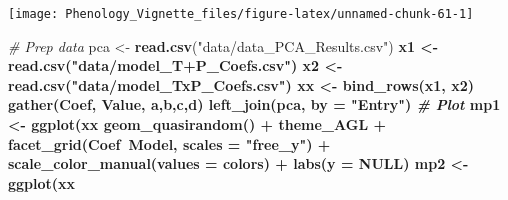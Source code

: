\documentclass[
]{article}
\newenvironment{Shaded}{\begin{snugshade}}{\end{snugshade}}
\newcommand{\CommentTok}[1]{\textcolor[rgb]{0.56,0.35,0.01}{\textit{#1}}}
\newcommand{\DataTypeTok}[1]{\textcolor[rgb]{0.13,0.29,0.53}{#1}}
\newcommand{\KeywordTok}[1]{\textcolor[rgb]{0.13,0.29,0.53}{\textbf{#1}}}
\newcommand{\NormalTok}[1]{#1}
\newcommand{\OperatorTok}[1]{\textcolor[rgb]{0.81,0.36,0.00}{\textbf{#1}}}
\newcommand{\OtherTok}[1]{\textcolor[rgb]{0.56,0.35,0.01}{#1}}
\newcommand{\StringTok}[1]{\textcolor[rgb]{0.31,0.60,0.02}{#1}}
\begin{document}
\texttt{[image: Phenology\_Vignette\_files/figure-latex/unnamed-chunk-61-1]}

\begin{Shaded}
\begin{Highlighting}[]
\CommentTok{# Prep data}
\NormalTok{pca <-}\StringTok{ }\KeywordTok{read.csv}\NormalTok{(}\StringTok{"data/data_PCA_Results.csv"}\NormalTok{) }\OperatorTok{%
\NormalTok{x1 <-}\StringTok{ }\KeywordTok{read.csv}\NormalTok{(}\StringTok{"data/model_T+P_Coefs.csv"}\NormalTok{) }\OperatorTok{%
\NormalTok{x2 <-}\StringTok{ }\KeywordTok{read.csv}\NormalTok{(}\StringTok{"data/model_TxP_Coefs.csv"}\NormalTok{) }\OperatorTok{%
\NormalTok{xx <-}\StringTok{ }\KeywordTok{bind_rows}\NormalTok{(x1, x2) }\OperatorTok{%
\StringTok{  }\KeywordTok{gather}\NormalTok{(Coef, Value, a,b,c,d) }\OperatorTok{%
\StringTok{  }\KeywordTok{left_join}\NormalTok{(pca, }\DataTypeTok{by =} \StringTok{"Entry"}\NormalTok{) }\OperatorTok{%
\CommentTok{# Plot}
\NormalTok{mp1 <-}\StringTok{ }\KeywordTok{ggplot}\NormalTok{(xx}\OperatorTok{%
\StringTok{  }\KeywordTok{geom_quasirandom}\NormalTok{() }\OperatorTok{+}\StringTok{ }\NormalTok{theme_AGL }\OperatorTok{+}
\StringTok{  }\KeywordTok{facet_grid}\NormalTok{(Coef}\OperatorTok{~}\NormalTok{Model, }\DataTypeTok{scales =} \StringTok{"free_y"}\NormalTok{) }\OperatorTok{+}\StringTok{ }
\StringTok{  }\KeywordTok{scale_color_manual}\NormalTok{(}\DataTypeTok{values =}\NormalTok{ colors) }\OperatorTok{+}\StringTok{ }\KeywordTok{labs}\NormalTok{(}\DataTypeTok{y =} \OtherTok{NULL}\NormalTok{)}
\NormalTok{mp2 <-}\StringTok{ }\KeywordTok{ggplot}\NormalTok{(xx}\OperatorTok{%
}}}}}}}}
\end{Highlighting}
\end{Shaded}
\end{document}
